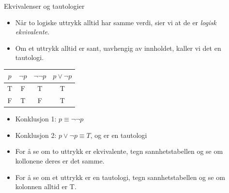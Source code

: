\begin{frame}{Ekvivalenser og tautologier}
    \begin{itemize}
        \item Når to logiske uttrykk alltid har samme verdi, sier vi at de er \emph{logisk ekvivalente}.
        \item Om et uttrykk alltid er sant, uavhengig av innholdet, kaller vi det en tautologi.
    \end{itemize}
    \begin{tabular}{c|c|c|c}
         $p$ & $\lnot p$ & $\lnot \lnot p$ & $p \lor \lnot p$\\ \hline
         T & F & T & T\\
         F & T & F & T
    \end{tabular}
    \pause
    \begin{itemize}
        \item Konklusjon 1: $p \equiv \lnot \lnot p$
        \pause
        \item Konklusjon 2: $p \lor \lnot p \equiv T$, og er en tautologi
        \pause
        \item For å se om to uttrykk er ekvivalente, tegn sannhetstabellen og se om kollonene deres er det samme.
        \item For å se om et uttrykk er en tautologi, tegn sannhetstabellen og se om kolonnen alltid er T.
    \end{itemize}
\end{frame}

